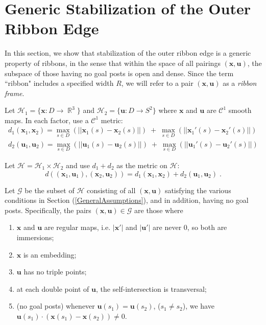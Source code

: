 \documentclass[12pt]{article}
\numberwithin{equation}{subsection}
\theoremstyle{definition}
\numberwithin{lem}{section}
\DeclareMathOperator{\R}{\mathbb{R}}
\def\v{\vspace{0.1in}}
\def\vv{\vspace{0.2in}}
\def\vecu{\mathbf{u}}
\def\uu{\mathbf{u}}
\def\vecx{\mathbf{x}}
\def\C{\mathcal{C}}
\def\G{\mathcal{G}}
\def\H{\mathcal{H}}
\begin{document}

\section{Generic Stabilization of the Outer Ribbon Edge}
\label{sec:stability}

\vv
In this section, we show that stabilization of the outer ribbon edge is a generic property of ribbons, in the sense that within the space of all pairings $(\mathbf{x},\uu)$, the subspace of those having no goal posts is open and dense. Since the term ``ribbon" includes a specified width $R$, we will refer to a pair $(\vecx, \vecu)$ as a {\em ribbon frame}.

\v
Let $\H_1 = \{\vecx:D \to \R^3\}$ and $\H_2 = \{\vecu:D \to S^2\}$ where $\vecx$ and $\vecu$ are $\C^1$ smooth maps.  In each factor, use a $\mathcal{C}^1$ metric:
\begin{eqnarray*}
d_1(\vecx_1, \vecx_2) = \max_{s \in D}(||\vecx_1(s)-\vecx_2(s)||) \; + \; \max_{s \in D}(||\vecx_1'(s)-\vecx_2'(s)||)
\\
 d_2(\vecu_1, \vecu_2) = \max_{s \in D}(||\vecu_1(s)-\vecu_2(s)||) \;+\;\max_{s \in D}(||\vecu_1'(s)-\vecu_2'(s)||)
 \end{eqnarray*}

Let $\H = \H_1 \times \H_2$ and use $d_1+d_2$ as the metric on $\H$: 
$$d((\vecx_1,\vecu_1), (\vecx_2,\vecu_2)) = d_1(\vecx_1,\vecx_2)+d_2(\vecu_1,\vecu_2)\;.$$

Let  $\G$ be the subset of $\H$ consisting of all  $(\vecx, \vecu)$ satisfying the various conditions in Section (\ref{GeneralAssumptions}), and in addition, having no goal posts.  Specifically, the pairs $(\vecx, \vecu) \in \G$ are those where

\begin{enumerate}
\item $\vecx$ and $\vecu$ are regular maps, i.e. $|\vecx'|$ and $|\vecu'|$ are never 0, so both are immersions; \label{xuregular}
\item $\vecx$ is an embedding; \label{xembedded}
\item $\vecu$ has no triple points; \label{notriplepoints}
\item at each double point of $\vecu$, the self-intersection is transversal; \label{uselftransversal}
\item (no goal posts) whenever   $\vecu(s_1) = \vecu(s_2)$,  ($s_1 \neq s_2$), we have $\vecu(s_1) \cdot (\vecx(s_1)-\vecx(s_2)) \neq 0$. \label{nogoalposts}
\end{enumerate}
\end{document}
